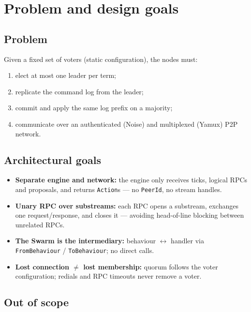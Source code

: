 \documentclass[11pt,a4paper]{article}
\newcommand{\code}[1]{{\def\_{\textunderscore\allowbreak}\texttt{#1}}}
\begin{document}
\section{Problem and design goals}

\subsection{Problem}

Given a fixed set of voters (static configuration), the nodes must:
\begin{enumerate}[label=\roman*., nosep]
  \item elect at most one leader per term;
  \item replicate the command log from the leader;
  \item commit and apply the same log prefix on a majority;
  \item communicate over an authenticated (Noise) and multiplexed (Yamux) P2P network.
\end{enumerate}

\subsection{Architectural goals}

\begin{designbox}
\begin{itemize}[nosep]
  \item \textbf{Separate engine and network:} the engine only receives ticks, logical RPCs and
        proposals, and returns \code{Action}s --- no \code{PeerId}, no stream handles.
  \item \textbf{Unary RPC over substreams:} each RPC opens a substream, exchanges one
        request/response, and closes it --- avoiding head-of-line blocking between unrelated RPCs.
  \item \textbf{The Swarm is the intermediary:} behaviour $\leftrightarrow$ handler via
        \code{FromBehaviour} / \code{ToBehaviour}; no direct calls.
  \item \textbf{Lost connection $\neq$ lost membership:} quorum follows the voter configuration;
        redials and RPC timeouts never remove a voter.
\end{itemize}
\end{designbox}

\subsection{Out of scope}
\end{document}
